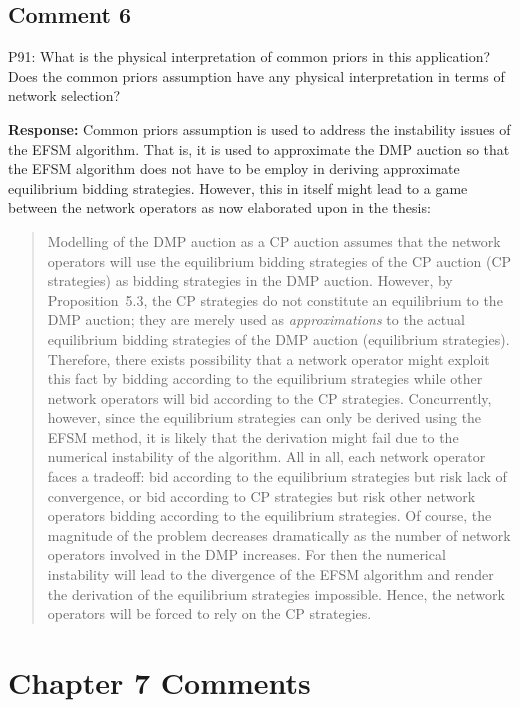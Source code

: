 \documentclass[10pt,a4paper,notitlepage]{article}
\numberwithin{equation}{section}
\begin{document}
\subsection{Comment 6}
P91: What is the physical interpretation of common priors in this application? Does the common priors assumption have any physical interpretation in terms of network selection?

\textbf{Response:}
Common priors assumption is used to address the instability issues of the EFSM algorithm. That is, it is used to approximate the DMP auction so that the EFSM algorithm does not have to be employ in deriving approximate equilibrium bidding strategies. However, this in itself might lead to a game between the network operators as now elaborated upon in the thesis:
\begin{quote}
Modelling of the DMP auction as a CP auction assumes that the network operators will use the equilibrium bidding strategies of the CP auction (CP strategies) as bidding strategies in the DMP auction. However, by Proposition~5.3, the CP strategies do not constitute an equilibrium to the DMP auction; they are merely used as \emph{approximations} to the actual equilibrium bidding strategies of the DMP auction (equilibrium strategies). Therefore, there exists possibility that a network operator might exploit this fact by bidding according to the equilibrium strategies while other network operators will bid according to the CP strategies. Concurrently, however, since the equilibrium strategies can only be derived using the EFSM method, it is likely that the derivation might fail due to the numerical instability of the algorithm. All in all, each network operator faces a tradeoff: bid according to the equilibrium strategies but risk lack of convergence, or bid according to CP strategies but risk other network operators bidding according to the equilibrium strategies. Of course, the magnitude of the problem decreases dramatically as the number of network operators involved in the DMP increases. For then the numerical instability will lead to the divergence of the EFSM algorithm and render the derivation of the equilibrium strategies impossible. Hence, the network operators will be forced to rely on the CP strategies.
\end{quote}

\clearpage

\section{Chapter 7 Comments}
\end{document}
